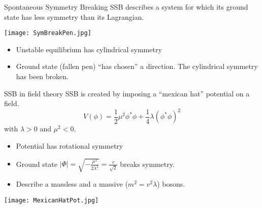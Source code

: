 \begin{frame}{Spontaneous Symmetry Breaking}
  SSB describes a system for which its ground state has less symmetry than its Lagrangian.

  \texttt{[image: SymBreakPen.jpg]}
  \begin{itemize}
  \item Unstable equilibrium has cylindrical symmetry
  \item Ground state (fallen pen) ``has chosen'' a direction.
    The cylindrical symmetry has been broken.
  \end{itemize}
\end{frame}
\begin{frame}{SSB in field theory}
  SSB is created by imposing a ``mexican hat'' potential on a field.
  \begin{equation}
    \label{eq:orgdea495d}
    V(\phi) = \frac{1}{2}\mu^2\phi^*\phi+\frac{1}{4}\lambda(\phi^*\phi)^2
  \end{equation}
  with  $\lambda>0$ and $\mu^2 <0$.
  
  \begin{minipage}{0.49\linewidth}
  \begin{itemize}
  \item Potential has rotational symmetry
  \item Ground state $|\Phi|=\sqrt{-\frac{\mu^2}{2\lambda^2}}= \frac{v}{\sqrt{2}}$ breaks symmetry.
  \item Describe a massless and a massive ($m^2=v^2\lambda$) bosons.
  \end{itemize}
  \end{minipage}
  \hfill
  \begin{minipage}{0.49\linewidth}
    \texttt{[image: MexicanHatPot.jpg]}
  \end{minipage}
\end{frame}
